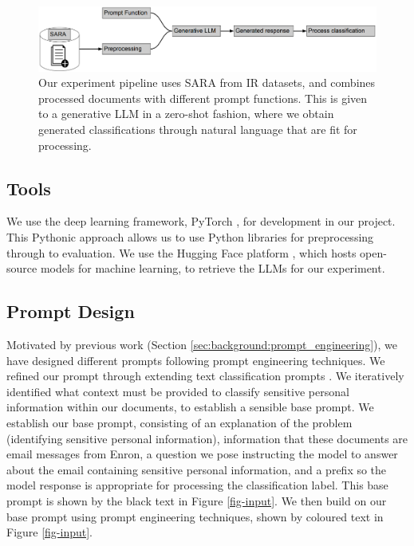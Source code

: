 \begin{figure}[!h]
\begin{center}
\includegraphics[scale=0.3]{figures/pipeline.pdf}
\end{center}
\caption{\label{fig-pipeline}Our experiment pipeline uses SARA from IR datasets, and combines processed documents with different prompt functions. This is given to a generative LLM in a zero-shot fashion, where we obtain generated classifications through natural language that are fit for processing.}
\end{figure}

\subsection{Tools}
We use the deep learning framework, PyTorch \cite{paszke2019pytorch}, for development in our project. This Pythonic approach allows us to use Python libraries for preprocessing through to evaluation. We use the Hugging Face platform \cite{wolf-etal-2020-transformers}, which hosts open-source models for machine learning, to retrieve the LLMs for our experiment.

\subsection{Prompt Design}
Motivated by previous work (Section \ref{sec:background:prompt_engineering}), we have designed different prompts following prompt engineering techniques. We refined our prompt through extending text classification prompts \cite{kocon2023chatgpt, puri2019zero}. We iteratively identified what context must be provided to classify sensitive personal information within our documents, to establish a sensible base prompt. We establish our base prompt, consisting of an explanation of the problem (identifying sensitive personal information), information that these documents are email messages from Enron, a question we pose instructing the model to answer about the email containing sensitive personal information, and a prefix so the model response is appropriate for processing the classification label. This base prompt is shown by the black text in Figure \ref{fig-input}. We then build on our base prompt using prompt engineering techniques, shown by coloured text in Figure \ref{fig-input}.

